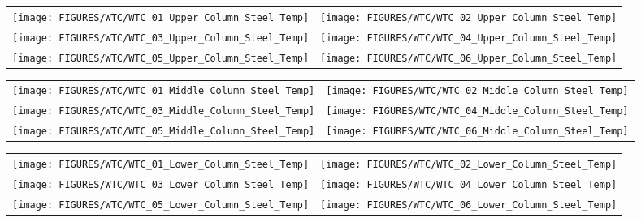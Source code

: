 \newpage

\begin{figure}[p]
\begin{tabular*}{\textwidth}{l@{\extracolsep{\fill}}r}
\texttt{[image: FIGURES/WTC/WTC\_01\_Upper\_Column\_Steel\_Temp]} &
\texttt{[image: FIGURES/WTC/WTC\_02\_Upper\_Column\_Steel\_Temp]} \\
\texttt{[image: FIGURES/WTC/WTC\_03\_Upper\_Column\_Steel\_Temp]} &
\texttt{[image: FIGURES/WTC/WTC\_04\_Upper\_Column\_Steel\_Temp]} \\
\texttt{[image: FIGURES/WTC/WTC\_05\_Upper\_Column\_Steel\_Temp]} &
\texttt{[image: FIGURES/WTC/WTC\_06\_Upper\_Column\_Steel\_Temp]}
\end{tabular*}
\label{NIST_WTC_Upper_Column_Steel}
\end{figure}

\begin{figure}[p]
\begin{tabular*}{\textwidth}{l@{\extracolsep{\fill}}r}
\texttt{[image: FIGURES/WTC/WTC\_01\_Middle\_Column\_Steel\_Temp]} &
\texttt{[image: FIGURES/WTC/WTC\_02\_Middle\_Column\_Steel\_Temp]} \\
\texttt{[image: FIGURES/WTC/WTC\_03\_Middle\_Column\_Steel\_Temp]} &
\texttt{[image: FIGURES/WTC/WTC\_04\_Middle\_Column\_Steel\_Temp]} \\
\texttt{[image: FIGURES/WTC/WTC\_05\_Middle\_Column\_Steel\_Temp]} &
\texttt{[image: FIGURES/WTC/WTC\_06\_Middle\_Column\_Steel\_Temp]}
\end{tabular*}
\label{NIST_WTC_Middle_Column_Steel}
\end{figure}

\begin{figure}[p]
\begin{tabular*}{\textwidth}{l@{\extracolsep{\fill}}r}
\texttt{[image: FIGURES/WTC/WTC\_01\_Lower\_Column\_Steel\_Temp]} &
\texttt{[image: FIGURES/WTC/WTC\_02\_Lower\_Column\_Steel\_Temp]} \\
\texttt{[image: FIGURES/WTC/WTC\_03\_Lower\_Column\_Steel\_Temp]} &
\texttt{[image: FIGURES/WTC/WTC\_04\_Lower\_Column\_Steel\_Temp]} \\
\texttt{[image: FIGURES/WTC/WTC\_05\_Lower\_Column\_Steel\_Temp]} &
\texttt{[image: FIGURES/WTC/WTC\_06\_Lower\_Column\_Steel\_Temp]}
\end{tabular*}
\label{NIST_WTC_Lower_Column_Steel}
\end{figure}

